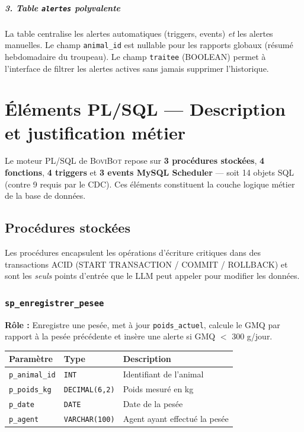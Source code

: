 \documentclass[12pt, a4paper, oneside]{report}
\newcommand{\bovibot}{\textsc{BoviBot}}
\begin{document}
\paragraph{3. Table \texttt{alertes} polyvalente}
La table centralise les alertes automatiques (triggers, events) \emph{et} les alertes
manuelles. Le champ \texttt{animal\_id} est nullable pour les rapports globaux
(résumé hebdomadaire du troupeau). Le champ \texttt{traitee} (BOOLEAN) permet à
l'interface de filtrer les alertes actives sans jamais supprimer l'historique.

\chapter{Éléments PL/SQL — Description et justification métier}

Le moteur PL/SQL de \bovibot{} repose sur \textbf{3 procédures stockées},
\textbf{4 fonctions}, \textbf{4 triggers} et \textbf{3 events MySQL Scheduler}
— soit 14 objets SQL (contre 9 requis par le CDC). Ces éléments constituent la couche
logique métier de la base de données.

\section{Procédures stockées}

Les procédures encapsulent les opérations d'écriture critiques dans des transactions
ACID (START TRANSACTION / COMMIT / ROLLBACK) et sont les \emph{seuls} points d'entrée
que le LLM peut appeler pour modifier les données.

\subsection{\texttt{sp\_enregistrer\_pesee}}

\textbf{Rôle :} Enregistre une pesée, met à jour \texttt{poids\_actuel}, calcule le GMQ
par rapport à la pesée précédente et insère une alerte si GMQ $<$ 300 g/jour.

\begin{center}\small
  \begin{tabular}{@{}llL{7cm}@{}}
    \toprule
    \textbf{Paramètre} & \textbf{Type} & \textbf{Description} \\
    \midrule
    \texttt{p\_animal\_id} & \texttt{INT}          & Identifiant de l'animal \\
    \texttt{p\_poids\_kg}  & \texttt{DECIMAL(6,2)} & Poids mesuré en kg \\
    \texttt{p\_date}       & \texttt{DATE}         & Date de la pesée \\
    \texttt{p\_agent}      & \texttt{VARCHAR(100)} & Agent ayant effectué la pesée \\
    \bottomrule
  \end{tabular}
\end{center}
\end{document}
